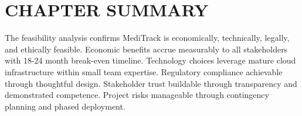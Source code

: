 \documentclass[12pt,a4paper]{report}
\begin{document}
\section*{CHAPTER SUMMARY}

The feasibility analysis confirms MediTrack is economically, technically, legally, and ethically feasible. Economic benefits accrue measurably to all stakeholders with 18-24 month break-even timeline. Technology choices leverage mature cloud infrastructure within small team expertise. Regulatory compliance achievable through thoughtful design. Stakeholder trust buildable through transparency and demonstrated competence. Project risks manageable through contingency planning and phased deployment.
\end{document}
